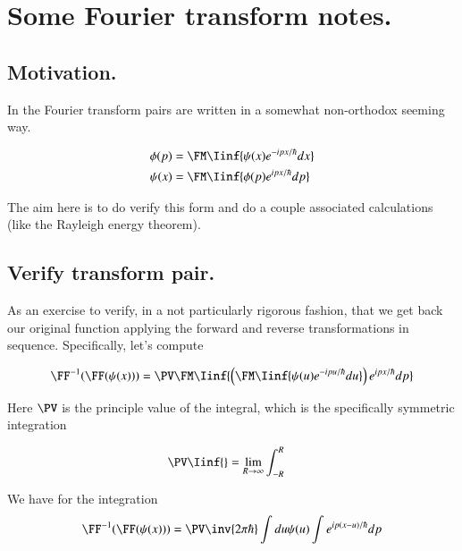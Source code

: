 \chapter{Some Fourier transform notes.}\label{chap:PJqmFourier}
\date{ Jan 09, 2009.  $RCSfile: fourierTx.tex,v $ Last $Revision: 1.10 $ $Date: 2009/06/11 16:45:58 $ }

\section{Motivation. }

In \cite{mcmahon2005qmd} the Fourier transform pairs are written in a somewhat 
non-orthodox seeming way.

\begin{align*}
\phi(p) &= \FM \Iinf{\psi(x) e^{-ipx/\hbar} dx} \\
\psi(x) &= \FM \Iinf{\phi(p) e^{ipx/\hbar} dp} \\
\end{align*}

The aim here is to do verify this form and do a couple associated calculations (like the Rayleigh energy theorem).

\section{Verify transform pair. }

As an exercise to verify, in a not particularly rigorous fashion, that we get back our original function applying the forward and reverse transformations
in sequence.  Specifically, let's compute

\begin{align*}
\FF^{-1}(\FF(\psi(x)))
&= \PV \FM \Iinf{\left(\FM \Iinf{\psi(u) e^{-ipu/\hbar} du}\right) e^{ipx/\hbar} dp} \\
\end{align*}

Here $\PV$ is the principle value of the integral, which is the specifically symmetric integration

\begin{align*}
\PV \Iinf{} &= \lim_{R \rightarrow \infty} \int_{-R}^R
\end{align*}

We have for the integration
\begin{align*}
\FF^{-1}(\FF(\psi(x)))
&= \PV \inv{{2\pi\hbar}} \int du \psi(u) \int e^{i p (x-u)/\hbar} dp \\
\end{align*}

